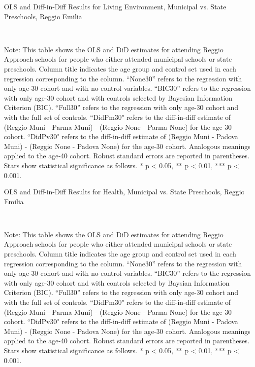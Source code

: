 \begin{landscape}
\begin{table}[H] \caption{OLS and Diff-in-Diff Results for Living Environment, Municipal vs. State Preschools, Reggio Emilia} \label{ols-L-reg}
\scalebox{0.85}{
}
\vspace{1ex} \\
\footnotesize\raggedright{Note: This table shows the OLS and DiD estimates for attending Reggio Approach schools for people who either attended municipal schools or state preschools. Column title indicates the age group and control set used in each regression corresponding to the column. ``None30'' refers to the regression with only age-30 cohort and with no control variables. ``BIC30'' refers to the regression with only age-30 cohort and with controls selected by Bayesian Information Criterion (BIC). ``Full30'' refers to the regression with only age-30 cohort and with the full set of controls. ``DidPm30" refers to the diff-in-diff estimate of (Reggio Muni - Parma Muni) - (Reggio None - Parma None) for the age-30 cohort. ``DidPv30" refers to the diff-in-diff estimate of (Reggio Muni - Padova Muni) - (Reggio None - Padova None) for the age-30 cohort. Analogous meanings applied to the age-40 cohort. Robust standard errors are reported in parentheses. Stars show statistical significance as follows. * p < 0.05, ** p < 0.01, *** p < 0.001.}
\end{table}


\begin{table}[H] \caption{OLS and Diff-in-Diff Results for Health, Municipal vs. State Preschools, Reggio Emilia} \label{ols-H-reg}
\scalebox{0.85}{
}
\vspace{1ex} \\
\footnotesize\raggedright{Note: This table shows the OLS and DiD estimates for attending Reggio Approach schools for people who either attended municipal schools or state preschools. Column title indicates the age group and control set used in each regression corresponding to the column. ``None30'' refers to the regression with only age-30 cohort and with no control variables. ``BIC30'' refers to the regression with only age-30 cohort and with controls selected by Baysian Information Criterion (BIC). ``Full30'' refers to the regression with only age-30 cohort and with the full set of controls. ``DidPm30" refers to the diff-in-diff estimate of (Reggio Muni - Parma Muni) - (Reggio None - Parma None) for the age-30 cohort. ``DidPv30" refers to the diff-in-diff estimate of (Reggio Muni - Padova Muni) - (Reggio None - Padova None) for the age-30 cohort. Analogous meanings applied to the age-40 cohort. Robust standard errors are reported in parentheses. Stars show statistical significance as follows. * p < 0.05, ** p < 0.01, *** p < 0.001.}
\end{table}


\end{landscape}

